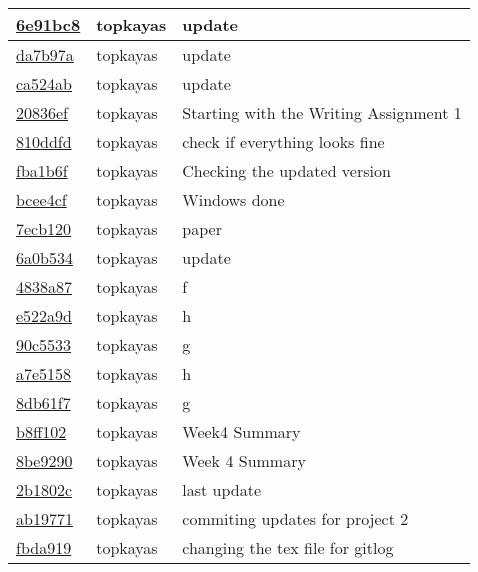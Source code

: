 \begin{tabular}{l l l}
\href{git@github.com:topkayas/CS444/commit/6e91bc83dea6dbe8f7916dccd0ed4969bbcdf2c4}{6e91bc8} & topkayas & update\\\hline
\href{git@github.com:topkayas/CS444/commit/da7b97ae1b38f767f211432d63b1cb1535208377}{da7b97a} & topkayas & update\\\hline
\href{git@github.com:topkayas/CS444/commit/ca524ab7c929dc1e7d0e977ce1d2e19452e40718}{ca524ab} & topkayas & update\\\hline
\href{git@github.com:topkayas/CS444/commit/20836ef8a96f97bfcfe0d8a01f4e0aeaaeb7438b}{20836ef} & topkayas & Starting with the Writing Assignment 1\\\hline
\href{git@github.com:topkayas/CS444/commit/810ddfde1cd5aff5b3973e41f92779faff0bde06}{810ddfd} & topkayas & check if everything looks fine\\\hline
\href{git@github.com:topkayas/CS444/commit/fba1b6f752edb17e9a05c9e74bc2b4df7f14f1c8}{fba1b6f} & topkayas & Checking the updated version\\\hline
\href{git@github.com:topkayas/CS444/commit/bcee4cf40b3a2945e795c81d45184fbc51806cd7}{bcee4cf} & topkayas & Windows done\\\hline
\href{git@github.com:topkayas/CS444/commit/7ecb120b31b8d85b1c441e9fcc72113e5bc0dcc5}{7ecb120} & topkayas & paper\\\hline
\href{git@github.com:topkayas/CS444/commit/6a0b5342ec1ed581ddbe751da36483ff4a391cb1}{6a0b534} & topkayas & update\\\hline
\href{git@github.com:topkayas/CS444/commit/4838a87c6da32de64b3434de11996b7fb3c2ded6}{4838a87} & topkayas & f\\\hline
\href{git@github.com:topkayas/CS444/commit/e522a9db42f957b862b5a4a6883dc96ebe12a5af}{e522a9d} & topkayas & h\\\hline
\href{git@github.com:topkayas/CS444/commit/90c55337881a81dc960a6e5cce07e2aadc7dca57}{90c5533} & topkayas & g\\\hline
\href{git@github.com:topkayas/CS444/commit/a7e5158a71a2e21d8965232d7f966d84c58b4925}{a7e5158} & topkayas & h\\\hline
\href{git@github.com:topkayas/CS444/commit/8db61f790d72db60a0079bdea7ea90b2c7db6872}{8db61f7} & topkayas & g\\\hline
\href{git@github.com:topkayas/CS444/commit/b8ff1022d12b6742cebcb54378369ff782dac89f}{b8ff102} & topkayas & Week4 Summary\\\hline
\href{git@github.com:topkayas/CS444/commit/8be92908e659605ebe7f457758fb51036d05dbef}{8be9290} & topkayas & Week 4 Summary\\\hline
\href{git@github.com:topkayas/CS444/commit/2b1802c27d1698a16d0af379c06764c9615671ca}{2b1802c} & topkayas & last update\\\hline
\href{git@github.com:topkayas/CS444/commit/ab19771e084bd55e0b12ca6d5240ca33f1461146}{ab19771} & topkayas & commiting updates for project 2\\\hline
\href{git@github.com:topkayas/CS444/commit/fbda9191ce05a70288b9e2e0a8051c9378b816e8}{fbda919} & topkayas & changing the tex file for gitlog\\\hline\end{tabular}
